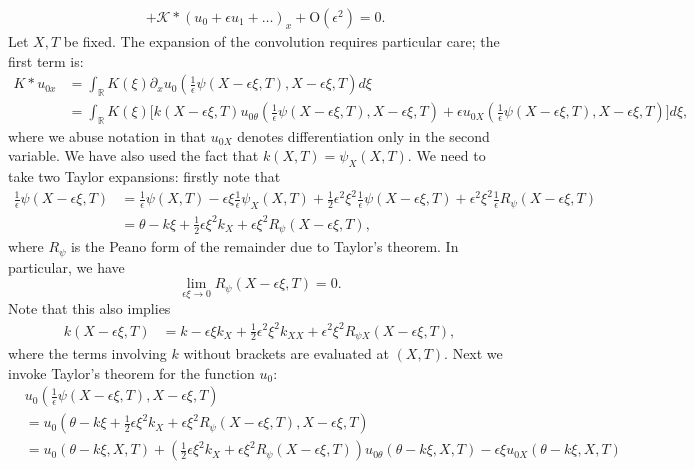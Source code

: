 \documentclass[11pt,leqno]{article}
\numberwithin{equation}{section}
\newcommand{\R}{\mathbb R}
\theoremstyle{definition}
\begin{document}
\begin{appendices}
\begin{equation}
\begin{aligned}
		&+ \mathcal{K}*(u_{0} + \epsilon u_{1} + \dots)_{x}  + \mathrm{O}(\epsilon^{2}) = 0. 
	\end{aligned}
	\end{equation}
	Let $ X,T $ be fixed. The expansion of the convolution requires particular care; the first term is:
	\begin{align*}
		K*u_{0x} &= \int_{\R}K(\xi)\partial_{x}u_{0}\left(\frac{1}{\epsilon}\psi(X-\epsilon\xi,T),X-\epsilon\xi,T\right)d\xi\\
		&= \int_{\R}K(\xi)\bigg[k(X-\epsilon\xi,T)u_{0\theta}\left(\frac{1}{\epsilon}\psi(X-\epsilon\xi,T),X-\epsilon\xi,T\right) + \epsilon u_{0X}\left(\frac{1}{\epsilon}\psi(X-\epsilon\xi,T),X-\epsilon\xi,T\right)\bigg]d\xi,
	\end{align*}
	where we abuse notation in that $ u_{0X} $ denotes differentiation only in the second variable. We have also used the fact that $ k(X,T) = \psi_{X}(X,T) $. We need to take two Taylor expansions: firstly note that
	\begin{align*}
		\frac{1}{\epsilon}\psi(X-\epsilon\xi,T) &= \frac{1}{\epsilon}\psi(X,T) - \epsilon\xi\frac{1}{\epsilon}\psi_{X}(X,T) + \frac{1}{2}\epsilon^{2}\xi^{2}\frac{1}{\epsilon}\psi(X-\epsilon\xi,T) + \epsilon^{2}\xi^{2}\frac{1}{\epsilon}R_{\psi}(X-\epsilon\xi,T)\\
		&= \theta - k\xi + \frac{1}{2}\epsilon\xi^{2}k_{X} + \epsilon\xi^{2}R_{\psi}(X-\epsilon\xi,T),
	\end{align*}
	where $ R_{\psi} $ is the Peano form of the remainder due to Taylor's theorem. In particular, we have
	\[
	\lim_{\epsilon\xi \rightarrow 0}R_{\psi}(X-\epsilon\xi,T) = 0.\]
	Note that this also implies
	\begin{align*}
		k(X-\epsilon\xi,T) &= k - \epsilon\xi k_{X} + \frac{1}{2}\epsilon^{2}\xi^{2}k_{XX} + \epsilon^{2}\xi^{2}R_{\psi X}(X-\epsilon\xi,T),
	\end{align*}
	where the terms involving $ k $ without brackets are evaluated at $ (X,T) $. Next we invoke Taylor's theorem for the function $ u_{0} $:
	\begin{align*}
		&u_{0}\left(\frac{1}{\epsilon}\psi(X-\epsilon\xi,T),X-\epsilon\xi,T\right)\\
		&= u_{0}\left(\theta - k\xi + \frac{1}{2}\epsilon\xi^{2}k_{X} + \epsilon\xi^{2}R_{\psi}(X-\epsilon\xi,T),X-\epsilon\xi,T\right)\\
		&= u_{0}\left(\theta - k\xi,X,T\right) + \left(\frac{1}{2}\epsilon\xi^{2}k_{X} + \epsilon\xi^{2}R_{\psi}(X-\epsilon\xi,T)\right)u_{0\theta}\left(\theta - k\xi ,X,T\right) - \epsilon\xi u_{0X}\left(\theta - k\xi ,X,T\right)\\

\end{align*}
\end{appendices}
\end{document}
